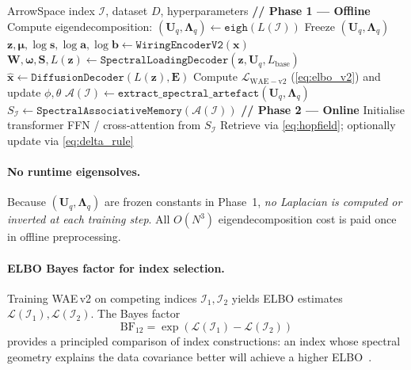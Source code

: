 \documentclass[11pt,a4paper]{article}
\newcommand{\I}{\mathcal{I}}
\newcommand{\A}{\mathcal{A}}
\newcommand{\elbo}{\mathcal{L}}
\newcommand{\bLambda}{\bm{\Lambda}}
\newcommand{\bU}{\bm{U}}
\newcommand{\bS}{\bm{S}}
\newcommand{\bW}{\bm{W}}
\newcommand{\bz}{\bm{z}}
\newcommand{\bmu}{\bm{\mu}}
\newcommand{\bomega}{\bm{\omega}}
\newcommand{\bx}{\bm{x}}
\newcommand{\bE}{\bm{E}}
\begin{document}
\begin{algorithm}[h]
\caption{WAE\,v2 Two-Phase Procedure}
\label{alg:two_phase}
\begin{algorithmic}[1]
\Require ArrowSpace index $\I$, dataset $D$, hyperparameters
\State \textbf{// Phase 1 --- Offline}
\State Compute eigendecomposition: $(\bU_q,\bLambda_q)\leftarrow\texttt{eigh}(L(\I))$ 
\State Freeze $(\bU_q,\bLambda_q)$
  \State $\bz,\bmu,\log\bm{s},\log\bm{a},\log\bm{b}\leftarrow\texttt{WiringEncoderV2}(\bx)$
  \State $\bW,\bomega,\bS,L(\bz)\leftarrow\texttt{SpectralLoadingDecoder}(\bz,\bU_q,L_{\mathrm{base}})$
  \State $\hat{\bx}\leftarrow\texttt{DiffusionDecoder}(L(\bz),\bE)$
  \State Compute $\mathcal{L}_{\mathrm{WAE-v2}}$ (\cref{eq:elbo_v2}) and update $\phi,\theta$
\EndFor
\State $\A(\I)\leftarrow\texttt{extract\_spectral\_artefact}(\bU_q,\bLambda_q)$
\State $S_{\I}\leftarrow\texttt{SpectralAssociativeMemory}(\A(\I))$
\State \textbf{// Phase 2 --- Online}
\State Initialise transformer FFN / cross-attention from $S_{\I}$
  \State Retrieve via \cref{eq:hopfield}; optionally update via \cref{eq:delta_rule}
\EndFor
\end{algorithmic}
\end{algorithm}

\paragraph{No runtime eigensolves.}
Because $(\bU_q,\bLambda_q)$ are frozen constants in Phase~1, \emph{no
Laplacian is computed or inverted at each training step}.  All $O(N^3)$
eigendecomposition cost is paid once in offline preprocessing.

\paragraph{ELBO Bayes factor for index selection.}
Training WAE\,v2 on competing indices $\I_1, \I_2$ yields ELBO estimates
$\elbo(\I_1),\elbo(\I_2)$.  The Bayes factor
\begin{equation}
  \mathrm{BF}_{12} = \exp(\elbo(\I_1) - \elbo(\I_2))
  \label{eq:bayes_factor}
\end{equation}
provides a principled comparison of index constructions: an index whose
spectral geometry explains the data covariance better will achieve a higher
ELBO~\citep{lotfi2022marginal}.

\end{document}

